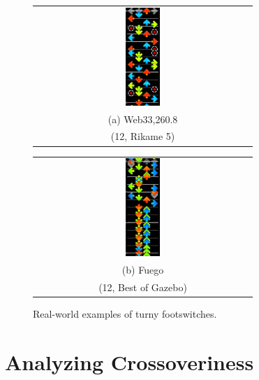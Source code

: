\documentclass[10pt]{sigplanconf}
\begin{document}
\begin{figure}[t]
	\begin{center}
	\begin{tabular}{c}
		\includegraphics[width=0.16\textwidth]{web33-dd-switch-270.png}
		\\
		(a) Web33,260.8 \\
		(12, Rikame 5)
	\end{tabular}
	\begin{tabular}{c}
		\includegraphics[width=0.16\textwidth]{fuego-candle-fs.png}
		\\
		(b) Fuego \\
		(12, Best of Gazebo)
	\end{tabular}
	\end{center}
	\caption{Real-world examples of turny footswitches.}
	\label{fig:real-world-turniness}
\end{figure}




\section{Analyzing Crossoveriness}
\end{document}
